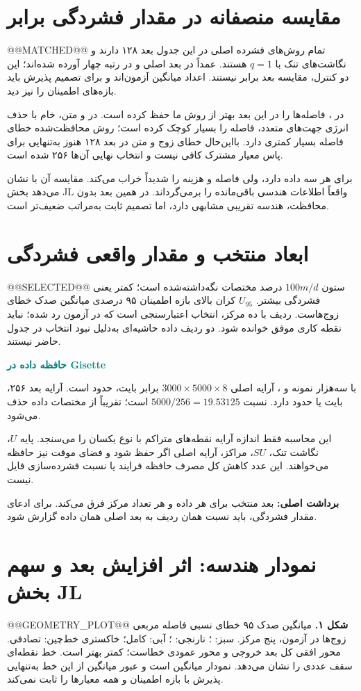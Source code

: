 \documentclass[11pt,a4paper]{article}
\newcommand{\lesson}[1]{\clearpage\section{#1}}
\newcommand{\key}[1]{\par\vspace{4pt}\noindent\colorbox{pale}{\parbox{\dimexpr\textwidth-2\fboxsep\relax}{\textbf{برداشت اصلی:} #1}}\par\vspace{3pt}}
\newcommand{\sub}[1]{\par\vspace{3pt}\textbf{\textcolor{teal}{#1}}\par}
\begin{document}
\lesson{مقایسه منصفانه در مقدار فشردگی برابر}
@@MATCHED@@
تمام روش‌های فشرده اصلی در این جدول بعد ۱۲۸ دارند و نگاشت‌های تنک با \(q=1\) هستند.  عمداً در بعد اصلی و  در رتبه چهار آورده شده‌اند؛ این دو کنترل، مقایسه بعد برابر نیستند. اعداد میانگین آزمون‌اند و برای تصمیم پذیرش باید بازه‌های اطمینان را نیز دید.

در ،  فاصله‌ها را در این بعد بهتر از روش ما حفظ کرده است. در  و متن،  خام با حذف انرژی جهت‌های متعدد، فاصله را بسیار کوچک کرده است؛ روش محافظت‌شده خطای فاصله بسیار کمتری دارد. بااین‌حال خطای زوج  و متن در بعد ۱۲۸ هنوز به‌تنهایی برای پاس معیار مشترک کافی نیست و انتخاب نهایی آن‌ها ۲۵۶ شده است.

 برای هر سه داده  دارد، ولی فاصله و هزینه را شدیداً خراب می‌کند. مقایسه آن با  نشان می‌دهد بخش JL واقعاً اطلاعات هندسی باقی‌مانده را برمی‌گرداند.  در همین بعد بدون محافظت، هندسه تقریبی مشابهی دارد، اما تصمیم ثابت به‌مراتب ضعیف‌تر است.

\lesson{ابعاد منتخب و مقدار واقعی فشردگی}
@@SELECTED@@
ستون \(100m/d\) درصد مختصات نگه‌داشته‌شده است؛ کمتر یعنی فشردگی بیشتر. \(U_{95}\) کران بالای بازه اطمینان ۹۵ درصدی میانگین صدک خطای زوج‌هاست. ردیف  با ده مرکز، انتخاب اعتبارسنجی است که در آزمون رد شده؛ نباید نقطه کاری موفق خوانده شود. دو ردیف داده حاشیه‌ای به‌دلیل نبود انتخاب در جدول حاضر نیستند.

\sub{حافظه داده در Gisette}
با سه‌هزار نمونه و ، آرایه اصلی \(3000\times5000\times8\) برابر  بایت، حدود  است. آرایه بعد ۲۵۶،  بایت یا حدود  دارد. نسبت \(5000/256=19.53125\) است؛ تقریباً  از مختصات داده حذف می‌شود.

این محاسبه فقط اندازه آرایه نقطه‌های متراکم با نوع یکسان را می‌سنجد. پایه \(U\)، نگاشت تنک، \(SU\)، مراکز، آرایه اصلی اگر حفظ شود و فضای موقت نیز حافظه می‌خواهند. این عدد کاهش کل مصرف حافظه فرایند یا نسبت فشرده‌سازی فایل  نیست.
\key{بعد منتخب برای هر داده و هر تعداد مرکز فرق می‌کند. برای ادعای مقدار فشردگی، باید نسبت همان ردیف به بعد اصلی همان داده گزارش شود.}

\lesson{نمودار هندسه: اثر افزایش بعد و سهم بخش JL}
@@GEOMETRY_PLOT@@
\textbf{شکل ۱.} میانگین صدک ۹۵ خطای نسبی فاصله مربعی زوج‌ها در آزمون، پنج مرکز. سبز: ؛ نارنجی: ؛ آبی:  کامل؛ خاکستری خط‌چین:  تصادفی. محور افقی کل بعد خروجی و محور عمودی خطاست؛ کمتر بهتر است. خط نقطه‌ای سقف عددی  را نشان می‌دهد. نمودار میانگین است و عبور میانگین از این خط به‌تنهایی پذیرش با بازه اطمینان و همه معیارها را ثابت نمی‌کند.
\end{document}
